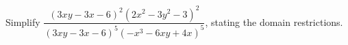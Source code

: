 Simplify $\dfrac{(3xy-3x-6)^2(2x^2-3y^2-3)^2}{(3xy-3x-6)^5(-x^3-6xy+4x)^5}$, stating the domain restrictions.
